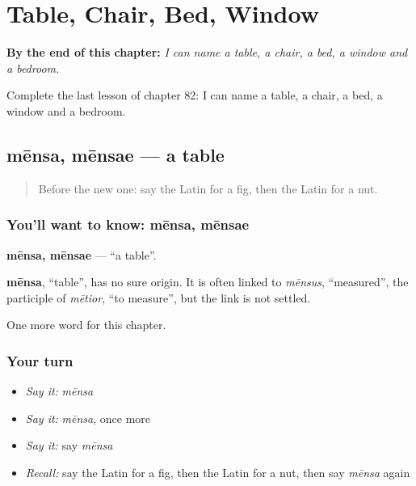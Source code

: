 
\chapter{Table, Chair, Bed, Window}
\label{ch:la-table-chair-bed-window}

\begin{chapteropening}
\textbf{By the end of this chapter:} \emph{I can name a table, a chair, a bed, a window and a bedroom.}

Complete the last lesson of chapter 82: I can name a table, a chair, a bed, a window and a bedroom.
\end{chapteropening}

\section[mēnsa, mēnsae]{mēnsa, mēnsae — a table}

\label{lesson:LA-C82-mensa}



\begin{quote}
Before the new one: say the Latin for a fig, then the Latin for a nut.
\end{quote}

\subsection*{You'll want to know: mēnsa, mēnsae}
\textbf{mēnsa, mēnsae} — \textquotedblleft{}a table\textquotedblright{}.

\begin{cousinweb}
\textbf{mēnsa}, \textquotedblleft{}table\textquotedblright{}, has no sure origin. It is often linked to \emph{mēnsus}, \textquotedblleft{}measured\textquotedblright{}, the participle of \emph{mētior}, \textquotedblleft{}to measure\textquotedblright{}, but the link is not settled.
\end{cousinweb}

\begin{grammarlens}[title={What you've built}]
One more word for this chapter.
\end{grammarlens}

\subsection*{Your turn}
\begin{itemize}
\raggedright
  \item \emph{Say it:} \emph{mēnsa}
  \item \emph{Say it:} \emph{mēnsa}, once more
  \item \emph{Say it:} say \emph{mēnsa}
  \item \emph{Recall:} say the Latin for a fig, then the Latin for a nut, then say \emph{mēnsa} again
\end{itemize}

